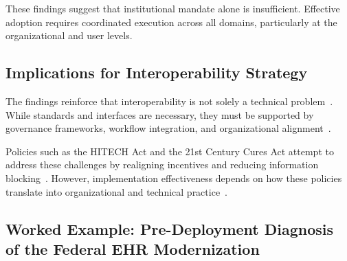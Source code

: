 These findings suggest that institutional mandate alone is insufficient. Effective adoption requires coordinated execution across all domains, particularly at the organizational and user levels.

\subsection{Implications for Interoperability Strategy}
The findings reinforce that interoperability is not solely a technical problem~\cite{torab2023interoperability,holmgren2023policyhie}. While standards and interfaces are necessary, they must be supported by governance frameworks, workflow integration, and organizational alignment~\cite{fennelly2020national,kruse2016adoption}.

Policies such as the HITECH Act and the 21st Century Cures Act attempt to address these challenges by realigning incentives and reducing information blocking~\cite{onc2025reports}. However, implementation effectiveness depends on how these policies translate into organizational and technical practice~\cite{holmgren2023policyhie,gao2025vaehr}.

\subsection{Worked Example: Pre-Deployment Diagnosis of the Federal EHR Modernization}

